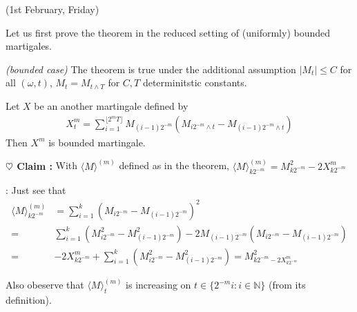 \documentclass[12pt,a4paper]{article}
\newenvironment{proof}
{\begin{changemargin}{0.5cm}{0.5cm} 
	}%
	{\end{changemargin}
}
\newenvironment{subproof}
{\begin{changemargin}{0.5cm}{0.5cm} 
	}%
	{\end{changemargin}
}
\newenvironment{p}
{\begin{proof} 
	}%
	{\end{proof}
}
\begin{document}
\newday

(1st February, Friday)
\s

Let us first prove the theorem in the reduced setting of (uniformly) bounded martigales.
\s

\lem \emph{(bounded case)} The theorem is true under the additional assumption $|M_t|\leq C$ for all $(\omega, t)$, $M_t = M_{t\wedge T}$ for $C,T$ determinitstic constants.
\begin{p}
\pf Let $X$ be an another martingale defined by
\begin{align*}
X_t^m = \sum_{i=1}^{\lfloor 2^m T \rfloor} M_{(i-1)2^{-m}} (M_{i2^{-m}\wedge t} - M_{(i-1)2^{-m}\wedge t})
\end{align*}
Then $X^m$ is bounded martingale.
\s

\textbf{$\heartsuit$ Claim :} With $\langle M \rangle^{(m)}$ defined as in the theorem, $\langle M\rangle_{k2^{-m}}^{(m)} = M^2_{k2^{-m}} - 2X^m_{k2^{-m}}$
\begin{subproof}
: Just see that \begin{align*}
\langle M\rangle_{k2^{-m}}^{(m)} &= \sum_{i=1}^k (M_{i2^{-m}} - M_{(i-1)2^{-m}} )^2 \\
=& \sum_{i=1}^{k} (M^2_{i2^{-m}} - M^2_{(i-1)2^{-m}}) - 2M_{(i-1)2^{-m}} (M_{i2^{-m}} - M_{(i-1)2^{-m}}) \\
=& -2X^m_{k2^{-m}} + \sum_{i=1}^k (M^2_{i2^{-m}} - M^2_{(i-1)2^{-m}}) = M^2_{k2^{-m} - 2X^m_{k2^{-m}}}
\end{align*}

Also obeserve that $\langle M \rangle_t^{(m)}$ is increasing on $t\in \{2^{-m}i : i\in\mathbb{N} \}$ (from its definition).
\end{subproof}
\s


\end{p}
\end{document}
